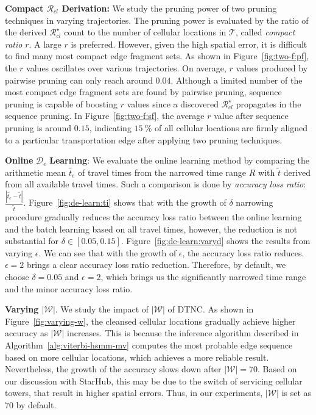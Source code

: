 \documentclass{vldb}
\begin{document}
	\textbf{Compact $\mathcal{R}_{cl}$ Derivation:} We study the pruning power of two pruning techniques in varying trajectories. The pruning power is evaluated by the ratio of the derived $\mathcal{R}_{cl}^\star$ count to the number of cellular locations in $\mathcal{T}$, called {\em compact ratio} $r$.
	A large $r$ is preferred. However, given the high spatial error, it is difficult to find many most compact edge fragment sets.
	As shown in Figure~\ref{fig:two-f:pf}, the $r$ values oscillates over various trajectories. On average, $r$ values produced by pairwise pruning can only reach around $0.04$.
	Although a limited number of the most compact edge fragment sets are found by pairwise pruning, sequence pruning is capable of boosting $r$ values since a discovered $\mathcal{R}^\star_{cl}$ propagates in the sequence pruning.
	In Figure~\ref{fig:two-f:sf}, the average $r$ value after sequence pruning is around $0.15$, indicating $15~\%$ of all cellular locations are firmly aligned to a particular transportation edge after applying two pruning techniques.
	
	\textbf{Online} $\mathcal{D}_e$ \textbf{Learning}: We evaluate the online learning method by comparing the arithmetic mean $\widetilde{t_e}$ of travel times from the narrowed time range $R$ with $\widetilde{t}$ derived from all available travel times. 
	Such a comparison is done by {\em accuracy loss ratio}: $\frac{|\widetilde{t_e}-\widetilde{t}|}{\widetilde{t}}$. 
	Figure~\ref{fig:de-learn:ti} shows that with the growth of $\delta$ narrowing procedure gradually reduces the accuracy loss ratio between the online learning and the batch learning based on all travel times, however, the reduction is not substantial for $\delta\in [0.05,0.15]$.
	Figure~\ref{fig:de-learn:varyd} shows the results from varying $\epsilon$.
	We can see that with the growth of $\epsilon$, the accuracy loss ratio reduces.
	$\epsilon=2$ brings a clear accuracy loss ratio reduction.
	Therefore, by default, we choose $\delta=0.05$ and $\epsilon=2$, which brings us the significantly narrowed time range and the minor accuracy loss ratio.
	
	
	\textbf{Varying $|\mathcal{W}|$}.
	We study the impact of $|\mathcal{W}|$ of DTNC.
	As shown in Figure~\ref{fig:varying-w}, the cleansed cellular locations gradually achieve higher accuracy as $|\mathcal{W}|$ increases.
	This is because the inference algorithm described in Algorithm~\ref{alg:viterbi-hsmm-mv} computes the most probable edge sequence based on more cellular locations, which achieves a more reliable result.
	Nevertheless, the growth of the accuracy slows down after $|\mathcal{W}|=70$.
	Based on our discussion with StarHub, this may be due to the switch of  servicing cellular towers, that result in higher spatial errors.
	Thus, in our experiments, $|\mathcal{W}|$ is set as $70$ by default.
\end{document}
